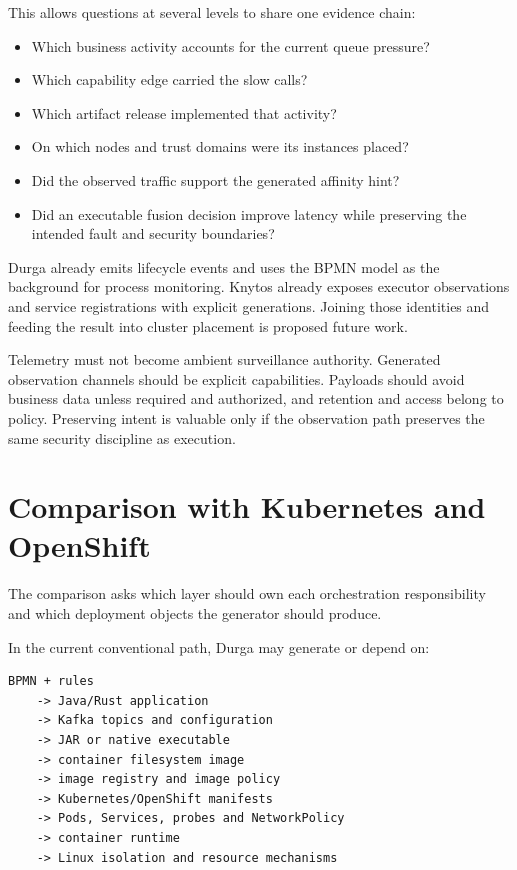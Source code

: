 This allows questions at several levels to share one evidence chain:

\begin{itemize}
    \item Which business activity accounts for the current queue pressure?
    \item Which capability edge carried the slow calls?
    \item Which artifact release implemented that activity?
    \item On which nodes and trust domains were its instances placed?
    \item Did the observed traffic support the generated affinity hint?
    \item Did an executable fusion decision improve latency while preserving
        the intended fault and security boundaries?
\end{itemize}

Durga already emits lifecycle events and uses the BPMN model as the background
for process monitoring. Knytos already exposes executor observations and
service registrations with explicit generations. Joining those identities and
feeding the result into cluster placement is proposed future work.

Telemetry must not become ambient surveillance authority. Generated observation
channels should be explicit capabilities. Payloads should avoid business data
unless required and authorized, and retention and access belong to policy.
Preserving intent is valuable only if the observation path preserves the same
security discipline as execution.

\section{Comparison with Kubernetes and OpenShift}

The comparison asks which layer should own each orchestration responsibility
and which deployment objects the generator should produce.

In the current conventional path, Durga may generate or depend on:

\begin{verbatim}
BPMN + rules
    -> Java/Rust application
    -> Kafka topics and configuration
    -> JAR or native executable
    -> container filesystem image
    -> image registry and image policy
    -> Kubernetes/OpenShift manifests
    -> Pods, Services, probes and NetworkPolicy
    -> container runtime
    -> Linux isolation and resource mechanisms
\end{verbatim}

